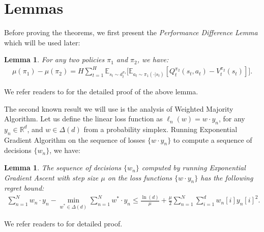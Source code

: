 \documentclass{article}
\newtheorem{lemma}[theorem]{Lemma}
\begin{document}
\section{Lemmas}
Before proving the theorems, we first present the \emph{Performance Difference Lemma} \cite{kakade2002approximately,ross2014reinforcement} which will be used later:
\begin{lemma}
\label{lemma:performance_difference}
For any two policies $\pi_1$ and $\pi_2$, we have:
\begin{align}
\mu(\pi_1) - \mu(\pi_2) = H\sum_{t=1}^H \mathbb{E}_{s_t\sim d_t^{\pi_1}}\big[\mathbb{E}_{a_t\sim \pi_1(\cdot|s_t)}[Q_t^{\pi_2}(s_t,a_t) - V_t^{\pi_2}(s_t)]\big].
\end{align}
\end{lemma} We refer readers to \cite{ross2014reinforcement} for the detailed proof of the above lemma. 

The second known result we will use is the analysis of Weighted Majority Algorithm. Let us define the linear loss function as $\ell_n(w) = w\cdot y_n$, for any $y_n\in\mathbb{R}^d$, and $w\in\Delta(d)$ from a probability simplex. Running Exponential Gradient Algorithm on the sequence of losses $\{w\cdot y_n\}$ to compute a sequence of decisions $\{w_n\}$, we have:
\begin{lemma} 
\label{lemma:EG}
The sequence of decisions $\{w_n\}$ computed by running Exponential Gradient Ascent with step size $\mu$ on the loss functions $\{w\cdot y_n\}$ has the following regret bound:
\begin{align}
\sum_{n=1}^N w_n\cdot y_n - \min_{w^*\in\Delta(d)} \sum_{n=1}^N w^*\cdot y_n \leq \frac{\ln(d)}{\mu} + \frac{\mu}{2}\sum_{n=1}^N\sum_{i=1}^d w_n[i] y_n[i]^2.
\end{align}
\end{lemma} We refer readers to \cite{shalev2012online} for detailed proof.
\end{document}
